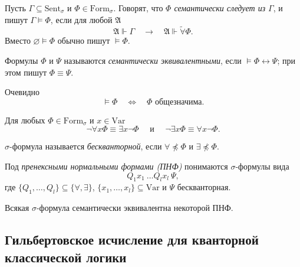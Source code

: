 \documentclass[12pt,a4paper]{article}
\newcommand{\Formul}{\ensuremath{\mathrm{Form}}\xspace}
\newcommand{\Var}{\ensuremath{\mathrm{Var}}\xspace}
\newcommand{\Sent}{\ensuremath{\mathrm{Sent}}\xspace}
\newcommand{\tildeforall}{\widetilde{\forall}}
\begin{document}
    \begin{definition}
        Пусть $\Gamma \subseteq \Sent_\sigma$ и $\Phi \in \Formul_\sigma$. Говорят, что \emph{$\Phi$ семантически следует из $\Gamma$}, и пишут $\Gamma \vDash \Phi$, если для любой $\mathfrak{A}$
        \[\mathfrak{A} \Vdash \Gamma \quad \longrightarrow \quad \mathfrak{A} \Vdash \tildeforall \Phi.\]
        Вместо $\varnothing \vDash \Phi$ обычно пишут $\vDash \Phi$.

        Формулы $\Phi$ и $\Psi$ называются \emph{семантически эквивалентными}, если $\vDash \Phi \leftrightarrow \Psi$; при этом пишут $\Phi \equiv \Psi$.
    \end{definition}

    \begin{remark}
        Очевидно
        \[\vDash \Phi \quad \Longleftrightarrow \quad \Phi \text{ общезначима}.\]
    \end{remark}

    \begin{example}
        Для любых $\Phi \in \Formul_\sigma$ и $x \in \Var$
        \[
            \neg \forall x \Phi \equiv \exists x \neg \Phi
            \quad \text{ и } \quad
            \neg \exists x \Phi \equiv \forall x \neg \Phi.
        \]
    \end{example}

    \begin{definition}
        $\sigma$-формула называется \emph{бескванторной}, если $\forall \not\preccurlyeq \Phi$ и $\exists \not\preccurlyeq \Phi$.

        Под \emph{пренексными нормальными формами (ПНФ)} понимаются $\sigma$-формулы вида
        \[Q_1 x_1\ \dots Q_l x_l\ \Psi,\]
        где $\{Q_1, \dots, Q_l\} \subseteq \{\forall, \exists\}$, $\{x_1, \dots, x_l\} \subseteq \Var$ и $\Psi$ бескванторная.
    \end{definition}

    \begin{exercise}
        Всякая $\sigma$-формула семантически эквивалентна некоторой ПНФ.
    \end{exercise}

    \subsection{Гильбертовское исчисление для кванторной классической логики}
\end{document}
